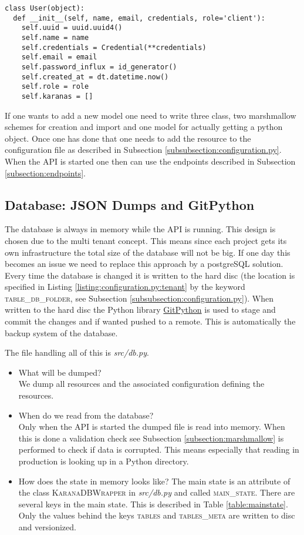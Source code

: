 \begin{lstlisting}[caption={Example for a marshmallow scheme, here user},label={listing:usermodel}]
class User(object):
  def __init__(self, name, email, credentials, role='client'):
    self.uuid = uuid.uuid4()
    self.name = name
    self.credentials = Credential(**credentials)
    self.email = email
    self.password_influx = id_generator()
    self.created_at = dt.datetime.now()
    self.role = role
    self.karanas = []  
\end{lstlisting}

If one wants to add a new model one need to write three class, two marshmallow schemes for creation and import and one model for actually getting a python object. Once one has done that one needs to add the resource to the configuration file as described in Subsection \ref{subsubsection:configuration.py}. When the API is started one then can use the endpoints described in Subsection \ref{subsection:endpoints}. 

\subsection{Database: JSON Dumps and GitPython}
The database is always in memory while the API is running. This design is chosen due to the multi tenant concept. This means since each project gets its own infrastructure the total size of the database will not be big. If one day this becomes an issue we need to replace this approach by a postgreSQL solution. Every time the database is changed it is written to the hard disc (the location is specified in Listing \ref{listing:configuration.py:tenant} by the keyword \textsc{table\_db\_folder}, see Subsection \ref{subsubsection:configuration.py}). When written to the hard disc the Python library \href{https://github.com/gitpython-developers/GitPython}{GitPython} is used to stage and commit the changes and if wanted pushed to a remote. This is automatically the backup system of the database. 

The file handling all of this is \textit{src/db.py}.
\begin{itemize}
	\item What will be dumped? \\
		We dump all resources and the associated configuration defining the resources.
	\item When do we read from the database? \\
		Only when the API is started the dumped file is read into memory. When this is done a validation check see Subsection \ref{subsection:marshmallow} is performed to check if data is corrupted. This means especially that reading in production is looking up in a Python directory.
	\item How does the state in memory looks like?
		The main state is an attribute of the class \textsc{KaranaDBWrapper} in \textit{src/db.py} and called \textsc{main\_state}. There are several keys in the main state. This is described in Table \ref{table:mainstate}. Only the values behind the keys \textsc{tables} and \textsc{tables\_meta} are written to disc and versionized.
\end{itemize}


